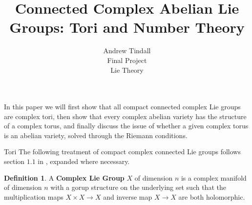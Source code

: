 \documentclass[12pt]{article}
\theoremstyle{definition}
\newtheorem{definition}[theorem]{Definition}
\begin{document}
 
 
\title{Connected Complex Abelian Lie Groups: Tori and Number Theory}
\author{Andrew Tindall\\
Final Project\\
Lie Theory}
 
\maketitle
In this paper we will first show that all compact connected complex Lie groups are complex tori, then show that every complex abelian variety has the structure of a complex torus, and finally discuss the issue of whether a given complex torus is an abelian variety, solved through the Riemann conditions. 
\begin{section}{Tori}
	The following treatment of compact complex connected Lie groups follows section $1.1$ in \cite{mumford}, expanded where necessary. 
	\begin{definition} A \textbf{Complex Lie Group} $X$ of dimension $n$ is a complex manifold of dimension $n$ with a gorup structure on the underlying set such that the multiplication maps $X \times X \to X$ and inverse map $X \to X$ are both holomorphic. 
		

\end{definition}
\end{section}
\end{document}
